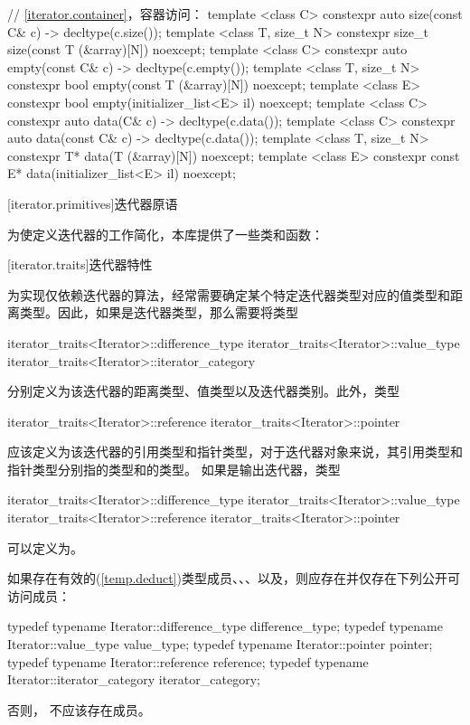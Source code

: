 \begin{codeblock}
{  // \ref{iterator.container}，容器访问：
  template <class C> constexpr auto size(const C& c) -> decltype(c.size());
  template <class T, size_t N> constexpr size_t size(const T (&array)[N]) noexcept;
  template <class C> constexpr auto empty(const C& c) -> decltype(c.empty());
  template <class T, size_t N> constexpr bool empty(const T (&array)[N]) noexcept;
  template <class E> constexpr bool empty(initializer_list<E> il) noexcept;
  template <class C> constexpr auto data(C& c) -> decltype(c.data());
  template <class C> constexpr auto data(const C& c) -> decltype(c.data());
  template <class T, size_t N> constexpr T* data(T (&array)[N]) noexcept;
  template <class E> constexpr const E* data(initializer_list<E> il) noexcept;
}
\end{codeblock}

[iterator.primitives]{迭代器原语}

\pnum
为使定义迭代器的工作简化，本库提供了一些类和函数：

[iterator.traits]{迭代器特性}

\pnum
为实现仅依赖迭代器的算法，经常需要确定某个特定迭代器类型对应的值类型和距离类型。因此，如果是迭代器类型，那么需要将类型
\begin{codeblock}
iterator_traits<Iterator>::difference_type
iterator_traits<Iterator>::value_type
iterator_traits<Iterator>::iterator_category
\end{codeblock}
分别定义为该迭代器的距离类型、值类型以及迭代器类别。此外，类型
\begin{codeblock}
iterator_traits<Iterator>::reference
iterator_traits<Iterator>::pointer
\end{codeblock}
应该定义为该迭代器的引用类型和指针类型，对于迭代器对象来说，其引用类型和指针类型分别指的类型和的类型。
如果是输出迭代器，类型
\begin{codeblock}
iterator_traits<Iterator>::difference_type
iterator_traits<Iterator>::value_type
iterator_traits<Iterator>::reference
iterator_traits<Iterator>::pointer
\end{codeblock}
可以定义为。

\pnum
如果存在有效的(\ref{temp.deduct})类型成员、、、以及，则应存在并仅存在下列公开可访问成员：
\begin{codeblock}
  typedef typename Iterator::difference_type difference_type;
  typedef typename Iterator::value_type value_type;
  typedef typename Iterator::pointer pointer;
  typedef typename Iterator::reference reference;
  typedef typename Iterator::iterator_category iterator_category;
\end{codeblock}
否则， 不应该存在成员。

